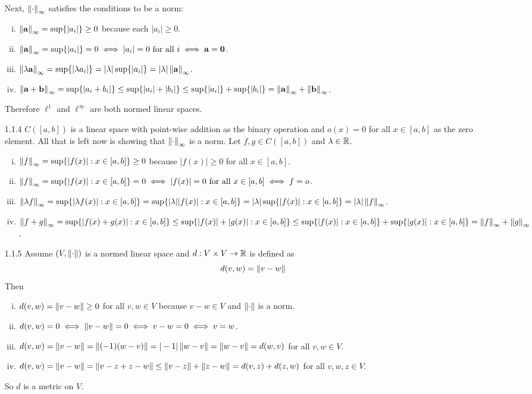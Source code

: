 \documentclass[../../Solutions.tex]{subfiles}
\begin{document}
\begin{itemize}
	Next, $\left\lVert\cdot\right\rVert_\infty$ satisfies the conditions to be a norm:
	\begin{enumerate}[(i)]
		\item $\left\lVert\mathbf{a}\right\rVert_\infty = \sup\{|a_i|\} \geq 0$ because each $|a_i| \geq 0$.
		\item $\left\lVert\mathbf{a}\right\rVert_\infty = \sup\{|a_i|\} = 0 \iff |a_i| = 0 \text{ for all } i \iff \mathbf{a} = \mathbf{0}$.
		\item $\left\lVert\lambda\mathbf{a}\right\rVert_\infty = \sup\{|\lambda a_i|\} = |\lambda|\sup\{|a_i|\} = |\lambda|\left\lVert\mathbf{a}\right\rVert_\infty$.
		\item $\left\lVert\mathbf{a}+\mathbf{b}\right\rVert_\infty = \sup\{|a_i+b_i|\} \leq \sup\{|a_i|+|b_i|\} \leq \sup\{|a_i|\}+\sup\{|b_i|\} = \left\lVert\mathbf{a}\right\rVert_\infty + \left\lVert\mathbf{b}\right\rVert_\infty$.
	\end{enumerate}
	Therefore $\ell^1$ and $\ell^\infty$ are both normed linear spaces.
	
	\item [1.1.4] $C([a,b])$ is a linear space with point-wise addition as the binary operation and $o(x)=0$ for all $x \in [a,b]$ as the zero element.
	All that is left now is showing that $\left\lVert\cdot\right\rVert_\infty$ is a norm.
	Let $f,g \in C([a,b])$ and $\lambda \in \mathbb{R}$.
	\begin{enumerate}[(i)]
		\item $\left\lVert f\right\rVert_\infty = \sup\{|f(x)|:x\in[a,b]\} \geq 0$ because $|f(x)| \geq 0$ for all $x \in [a,b]$.
		\item $\left\lVert f\right\rVert_\infty = \sup\{|f(x)|:x\in[a,b]\} = 0 \iff |f(x)| = 0 \text{ for all } x \in [a,b] \iff f = o$.
		\item $\left\lVert\lambda f\right\rVert_\infty = \sup\{|\lambda f(x)|:x\in[a,b]\} = \sup\{|\lambda||f(x)|:x\in[a,b]\} = |\lambda|\sup\{|f(x)|:x\in[a,b]\} = |\lambda|\left\lVert f\right\rVert_\infty$.
		\item $\left\lVert f+g\right\rVert_\infty = \sup\{|f(x)+g(x)|:x \in [a,b]\} \leq \sup\{|f(x)|+|g(x)|:x\in[a,b]\} \leq \sup\{|f(x)|:x\in[a,b]\}+\sup\{|g(x)|:x\in[a,b]\} = \left\lVert f\right\rVert_\infty+\left\lVert g\right\rVert_\infty$.
	\end{enumerate}
	
	\item [1.1.5] Assume $(V,\left\lVert\cdot\right\rVert)$ is a normed linear space and $d:V\times V \to \mathbb{R}$ is defined as
	$$ d(v,w) = \left\lVert v-w\right\rVert $$
	Then
	\begin{enumerate}[(i)]
		\item $d(v,w) = \left\lVert v-w\right\rVert \geq 0$ for all $v,w \in V$ because $v-w \in V$ and $\left\lVert\cdot\right\rVert$ is a norm.
		\item $d(v,w) = 0 \iff \left\lVert v-w\right\rVert = 0 \iff v-w = 0 \iff v=w$.
		\item $d(v,w) = \left\lVert v-w\right\rVert = \left\lVert(-1)(w-v)\right\rVert = |-1|\left\lVert w-v\right\rVert = \left\lVert w-v\right\rVert = d(w,v)$ for all $v,w \in V$.
		\item $d(v,w) = \left\lVert v-w\right\rVert = \left\lVert v-z+z-w\right\rVert \leq \left\lVert v-z\right\rVert+\left\lVert z-w\right\rVert = d(v,z)+d(z,w)$ for all $v,w,z \in V$.
	\end{enumerate}
	So $d$ is a metric on $V$.
	

\end{itemize}
\end{document}
